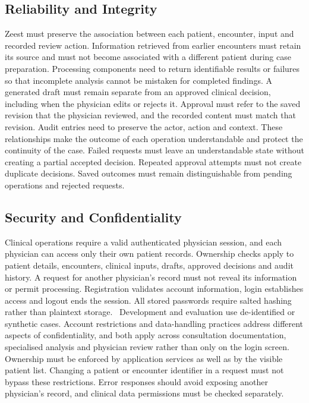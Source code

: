 \subsection{Reliability and Integrity}

Zeest must preserve the association between each patient, encounter, input and recorded review action. Information retrieved from earlier encounters must retain its source and must not become associated with a different patient during case preparation. Processing components need to return identifiable results or failures so that incomplete analysis cannot be mistaken for completed findings. A generated draft must remain separate from an approved clinical decision, including when the physician edits or rejects it. Approval must refer to the saved revision that the physician reviewed, and the recorded content must match that revision. Audit entries need to preserve the actor, action and context. These relationships make the outcome of each operation understandable and protect the continuity of the case. Failed requests must leave an understandable state without creating a partial accepted decision. Repeated approval attempts must not create duplicate decisions. Saved outcomes must remain distinguishable from pending operations and rejected requests.

\subsection{Security and Confidentiality}

Clinical operations require a valid authenticated physician session, and each physician can access only their own patient records. Ownership checks apply to patient details, encounters, clinical inputs, drafts, approved decisions and audit history. A request for another physician's record must not reveal its information or permit processing. Registration validates account information, login establishes access and logout ends the session. All stored passwords require salted hashing rather than plaintext storage.~\cite{zeestA:owaspPasswords} Development and evaluation use de-identified or synthetic cases. Account restrictions and data-handling practices address different aspects of confidentiality, and both apply across consultation documentation, specialised analysis and physician review rather than only on the login screen. Ownership must be enforced by application services as well as by the visible patient list. Changing a patient or encounter identifier in a request must not bypass these restrictions. Error responses should avoid exposing another physician's record, and clinical data permissions must be checked separately.

